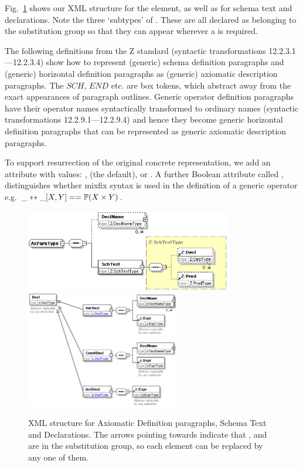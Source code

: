 \documentclass{llncs}  %
\begin{document}
Fig.~\ref{fig:axpara} shows our XML structure for the 
element, as well as for schema text and declarations.  Note the
three `subtypes' of .  These are all declared as belonging to
the  substitution group so that they can appear wherever
a  is required.

The following definitions from the Z standard
(syntactic transformations 12.2.3.1---12.2.3.4)
show how to represent (generic) schema definition paragraphs
and (generic) horizontal definition paragraphs
as (generic) axiomatic description paragraphs.  The $SCH$, $END$ {etc.} are
box tokens, which abstract away from the exact appearances of paragraph
outlines. 
\DTschemadef
\DTgenschemadef
\DThorizdef
\DTgenhorizdef
Generic operator definition paragraphs have their operator names
syntactically transformed to ordinary names
(syntactic transformations 12.2.9.1---12.2.9.4)
and hence they become generic horizontal definition paragraphs
that can be represented as generic axiomatic description paragraphs.

To support resurrection of the original concrete representation, we add an
attribute  with values: ,  (the
default), or .  A further Boolean attribute called
, distinguishes whether mixfix syntax is used in the 
definition of a generic operator
e.g. $\_ \rel \_ [X,Y] == \power(X \cross Y)$.

\begin{figure}[!htbp]
  \centering
  \includegraphics[width=0.8\textwidth]{axparatype.eps}
  \includegraphics[width=0.6\textwidth]{decls.eps}
  \caption{XML structure for Axiomatic Definition paragraphs, Schema Text
  and Declarations.  The arrows pointing towards  indicate that
  ,  and  are in the
   substitution group, so each  element can be
  replaced by any one of them.}
  \label{fig:axpara}
\end{figure}
\end{document}
